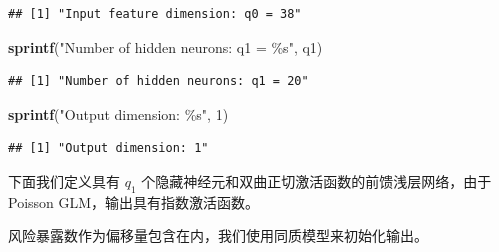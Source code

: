 \documentclass[
]{article}
\newenvironment{Shaded}{\begin{snugshade}}{\end{snugshade}}
\newcommand{\DecValTok}[1]{\textcolor[rgb]{0.00,0.00,0.81}{#1}}
\newcommand{\FunctionTok}[1]{\textcolor[rgb]{0.13,0.29,0.53}{\textbf{#1}}}
\newcommand{\NormalTok}[1]{#1}
\newcommand{\StringTok}[1]{\textcolor[rgb]{0.31,0.60,0.02}{#1}}
\begin{document}
\begin{verbatim}
## [1] "Input feature dimension: q0 = 38"
\end{verbatim}

\begin{Shaded}
\begin{Highlighting}[]
\FunctionTok{sprintf}\NormalTok{(}\StringTok{"Number of hidden neurons: q1 = \%s"}\NormalTok{, q1)}
\end{Highlighting}
\end{Shaded}

\begin{verbatim}
## [1] "Number of hidden neurons: q1 = 20"
\end{verbatim}

\begin{Shaded}
\begin{Highlighting}[]
\FunctionTok{sprintf}\NormalTok{(}\StringTok{"Output dimension: \%s"}\NormalTok{, }\DecValTok{1}\NormalTok{)}
\end{Highlighting}
\end{Shaded}

\begin{verbatim}
## [1] "Output dimension: 1"
\end{verbatim}

下面我们定义具有 \(q_1\)
个隐藏神经元和双曲正切激活函数的前馈浅层网络，由于 Poisson
GLM，输出具有指数激活函数。

风险暴露数作为偏移量包含在内，我们使用同质模型来初始化输出。
\end{document}
